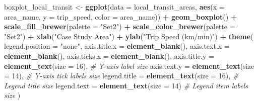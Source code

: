 \documentclass[
]{article}
\newenvironment{Shaded}{\begin{snugshade}}{\end{snugshade}}
\newcommand{\AttributeTok}[1]{\textcolor[rgb]{0.13,0.29,0.53}{#1}}
\newcommand{\CommentTok}[1]{\textcolor[rgb]{0.56,0.35,0.01}{\textit{#1}}}
\newcommand{\DecValTok}[1]{\textcolor[rgb]{0.00,0.00,0.81}{#1}}
\newcommand{\FunctionTok}[1]{\textcolor[rgb]{0.13,0.29,0.53}{\textbf{#1}}}
\newcommand{\NormalTok}[1]{#1}
\newcommand{\OtherTok}[1]{\textcolor[rgb]{0.56,0.35,0.01}{#1}}
\newcommand{\SpecialCharTok}[1]{\textcolor[rgb]{0.81,0.36,0.00}{\textbf{#1}}}
\newcommand{\StringTok}[1]{\textcolor[rgb]{0.31,0.60,0.02}{#1}}
\begin{document}
\begin{Shaded}
\begin{Highlighting}[]
\NormalTok{boxplot\_local\_transit }\OtherTok{\textless{}{-}} \FunctionTok{ggplot}\NormalTok{(}\AttributeTok{data =}\NormalTok{ local\_transit\_areas, }\FunctionTok{aes}\NormalTok{(}\AttributeTok{x =}\NormalTok{ area\_name, }\AttributeTok{y =}\NormalTok{ trip\_speed, }\AttributeTok{color =}\NormalTok{ area\_name)) }\SpecialCharTok{+} 
  \FunctionTok{geom\_boxplot}\NormalTok{() }\SpecialCharTok{+} 
  \FunctionTok{scale\_fill\_brewer}\NormalTok{(}\AttributeTok{palette =} \StringTok{"Set2"}\NormalTok{) }\SpecialCharTok{+} 
  \FunctionTok{scale\_color\_brewer}\NormalTok{(}\AttributeTok{palette =} \StringTok{"Set2"}\NormalTok{) }\SpecialCharTok{+} 
  \FunctionTok{xlab}\NormalTok{(}\StringTok{"Case Study Area"}\NormalTok{) }\SpecialCharTok{+} 
  \FunctionTok{ylab}\NormalTok{(}\StringTok{"Trip Speed (km/min)"}\NormalTok{) }\SpecialCharTok{+} 
  \FunctionTok{theme}\NormalTok{(}
    \AttributeTok{legend.position =} \StringTok{"none"}\NormalTok{, }
    \AttributeTok{axis.title.x =} \FunctionTok{element\_blank}\NormalTok{(), }
    \AttributeTok{axis.text.x =} \FunctionTok{element\_blank}\NormalTok{(), }
    \AttributeTok{axis.ticks.x =} \FunctionTok{element\_blank}\NormalTok{(),}
    \AttributeTok{axis.title.y =} \FunctionTok{element\_text}\NormalTok{(}\AttributeTok{size =} \DecValTok{16}\NormalTok{),      }\CommentTok{\# Y{-}axis label size}
    \AttributeTok{axis.text.y =} \FunctionTok{element\_text}\NormalTok{(}\AttributeTok{size =} \DecValTok{14}\NormalTok{),       }\CommentTok{\# Y{-}axis tick labels size}
    \AttributeTok{legend.title =} \FunctionTok{element\_text}\NormalTok{(}\AttributeTok{size =} \DecValTok{16}\NormalTok{),      }\CommentTok{\# Legend title size}
    \AttributeTok{legend.text =} \FunctionTok{element\_text}\NormalTok{(}\AttributeTok{size =} \DecValTok{14}\NormalTok{)        }\CommentTok{\# Legend item labels size}
\NormalTok{  )}


\end{Highlighting}
\end{Shaded}
\end{document}
